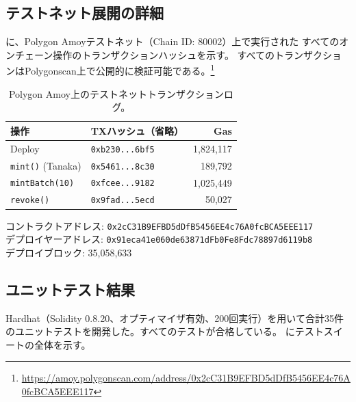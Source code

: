 
\subsection{テストネット展開の詳細}
\label{app:testnet}

に、Polygon Amoyテストネット（Chain ID: 80002）上で実行された
すべてのオンチェーン操作のトランザクションハッシュを示す。
すべてのトランザクションはPolygonscan上で公開的に検証可能である。\footnote{%
\url{https://amoy.polygonscan.com/address/0x2cC31B9EFBD5dDfB5456EE4c76A0fcBCA5EEE117}}

\begin{table}[ht]
\centering
\caption{Polygon Amoy上のテストネットトランザクションログ。}
\label{tab:testnet_txs}
\footnotesize
\setlength{\tabcolsep}{2pt}
\begin{tabular}{@{}llr@{}}
\toprule
\textbf{操作} & \textbf{TXハッシュ（省略）} & \textbf{Gas} \\
\midrule
Deploy
  & \texttt{0xb230...6bf5}
  & 1{,}824{,}117 \\
\texttt{mint()} (Tanaka)
  & \texttt{0x5461...8c30}
  & 189{,}792 \\
\texttt{mintBatch(10)}
  & \texttt{0xfcee...9182}
  & 1{,}025{,}449 \\
\texttt{revoke()}
  & \texttt{0x9fad...5ecd}
  & 50{,}027 \\
\bottomrule
\end{tabular}
\end{table}

コントラクトアドレス: \texttt{0x2cC31B9EFBD5dDfB5456EE4c76A0fcBCA5EEE117}\\
デプロイヤーアドレス: \texttt{0x91eca41e060de63871dFb0Fe8Fdc78897d6119b8}\\
デプロイブロック: 35{,}058{,}633

\subsection{ユニットテスト結果}
\label{app:tests}

Hardhat（Solidity 0.8.20、オプティマイザ有効、200回実行）を用いて合計35件のユニットテストを開発した。すべてのテストが合格している。
にテストスイートの全体を示す。

